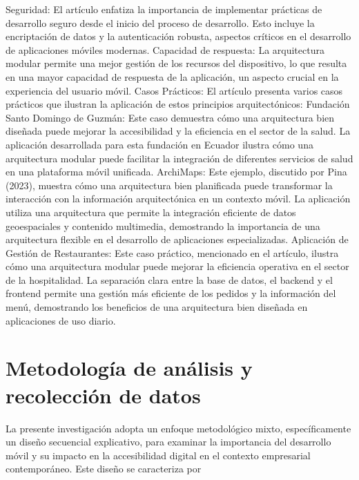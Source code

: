 \documentclass[12pt]{article}
\begin{document}
Seguridad: El artículo enfatiza la importancia de implementar prácticas de desarrollo seguro desde el inicio del proceso de desarrollo. Esto incluye la encriptación de datos y la autenticación robusta, aspectos críticos en el desarrollo de aplicaciones móviles modernas.
Capacidad de respuesta: La arquitectura modular permite una mejor gestión de los recursos del dispositivo, lo que resulta en una mayor capacidad de respuesta de la aplicación, un aspecto crucial en la experiencia del usuario móvil.
Casos Prácticos: El artículo presenta varios casos prácticos que ilustran la aplicación de estos principios arquitectónicos:
Fundación Santo Domingo de Guzmán: Este caso demuestra cómo una arquitectura bien diseñada puede mejorar la accesibilidad y la eficiencia en el sector de la salud. La aplicación desarrollada para esta fundación en Ecuador ilustra cómo una arquitectura modular puede facilitar la integración de diferentes servicios de salud en una plataforma móvil unificada.
ArchiMaps: Este ejemplo, discutido por Pina (2023), muestra cómo una arquitectura bien planificada puede transformar la interacción con la información arquitectónica en un contexto móvil. La aplicación utiliza una arquitectura que permite la integración eficiente de datos geoespaciales y contenido multimedia, demostrando la importancia de una arquitectura flexible en el desarrollo de aplicaciones especializadas.
Aplicación de Gestión de Restaurantes: Este caso práctico, mencionado en el artículo, ilustra cómo una arquitectura modular puede mejorar la eficiencia operativa en el sector de la hospitalidad. La separación clara entre la base de datos, el backend y el frontend permite una gestión más eficiente de los pedidos y la información del menú, demostrando los beneficios de una arquitectura bien diseñada en aplicaciones de uso diario.

\section*{Metodología de análisis y recolección de datos}
La presente investigación adopta un enfoque metodológico mixto, específicamente un diseño secuencial explicativo, para examinar la importancia del desarrollo móvil y su impacto en la accesibilidad digital en el contexto empresarial contemporáneo. Este diseño se caracteriza por
 
\end{document}
